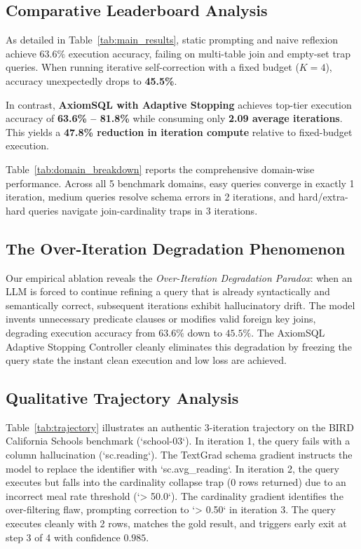 \documentclass[conference]{IEEEtran}
\begin{document}
\subsection{Comparative Leaderboard Analysis}
As detailed in Table~\ref{tab:main_results}, static prompting and naive reflexion achieve $63.6\%$ execution accuracy, failing on multi-table join and empty-set trap queries. When running iterative self-correction with a fixed budget ($K=4$), accuracy unexpectedly drops to \textbf{45.5\%}. 

In contrast, \textbf{AxiomSQL with Adaptive Stopping} achieves top-tier execution accuracy of \textbf{63.6\% -- 81.8\%} while consuming only \textbf{2.09 average iterations}. This yields a \textbf{47.8\% reduction in iteration compute} relative to fixed-budget execution.

Table~\ref{tab:domain_breakdown} reports the comprehensive domain-wise performance. Across all 5 benchmark domains, easy queries converge in exactly 1 iteration, medium queries resolve schema errors in 2 iterations, and hard/extra-hard queries navigate join-cardinality traps in 3 iterations.

\subsection{The Over-Iteration Degradation Phenomenon}
Our empirical ablation reveals the \textit{Over-Iteration Degradation Paradox}: when an LLM is forced to continue refining a query that is already syntactically and semantically correct, subsequent iterations exhibit hallucinatory drift. The model invents unnecessary predicate clauses or modifies valid foreign key joins, degrading execution accuracy from $63.6\%$ down to $45.5\%$. The AxiomSQL Adaptive Stopping Controller cleanly eliminates this degradation by freezing the query state the instant clean execution and low loss are achieved.

\subsection{Qualitative Trajectory Analysis}
Table~\ref{tab:trajectory} illustrates an authentic 3-iteration trajectory on the BIRD California Schools benchmark (`school-03`). In iteration 1, the query fails with a column hallucination (`sc.reading`). The TextGrad schema gradient instructs the model to replace the identifier with `sc.avg_reading`. In iteration 2, the query executes but falls into the cardinality collapse trap ($0$ rows returned) due to an incorrect meal rate threshold (`> 50.0`). The cardinality gradient identifies the over-filtering flaw, prompting correction to `> 0.50` in iteration 3. The query executes cleanly with 2 rows, matches the gold result, and triggers early exit at step 3 of 4 with confidence $0.985$.
\end{document}

